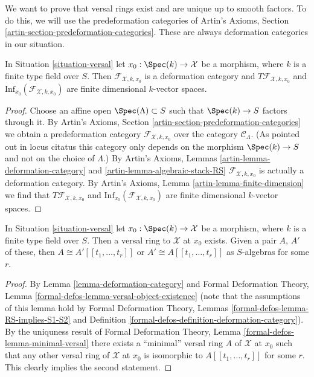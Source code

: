 \noindent
We want to prove that versal rings exist and are unique up to
smooth factors. To do this, we will use the predeformation categories of
Artin's Axioms, Section \ref{artin-section-predeformation-categories}.
These are always deformation categories in our situation.

\begin{lemma}
\label{lemma-deformation-category}
In Situation \ref{situation-versal} let $x_0 : \Spec(k) \to \mathcal{X}$
be a morphism, where $k$ is a finite type field over $S$.
Then $\mathcal{F}_{\mathcal{X}, k, x_0}$
is a deformation category and $T\mathcal{F}_{\mathcal{X}, k, x_0}$
and $\text{Inf}_{x_0}(\mathcal{F}_{\mathcal{X}, k, x_0})$
are finite dimensional $k$-vector spaces.
\end{lemma}

\begin{proof}
Choose an affine open $\Spec(\Lambda) \subset S$ such that
$\Spec(k) \to S$ factors through it.
By Artin's Axioms, Section \ref{artin-section-predeformation-categories}
we obtain a predeformation category
$\mathcal{F}_{\mathcal{X}, k, x_0}$
over the category $\mathcal{C}_\Lambda$.
(As pointed out in locus citatus this category only depends
on the morphism $\Spec(k) \to S$ and not on the choice of
$\Lambda$.) By Artin's Axioms, Lemmas
\ref{artin-lemma-deformation-category} and
\ref{artin-lemma-algebraic-stack-RS}
$\mathcal{F}_{\mathcal{X}, k, x_0}$ is actually a deformation category.
By Artin's Axioms, Lemma \ref{artin-lemma-finite-dimension}
we find that $T\mathcal{F}_{\mathcal{X}, k, x_0}$
and $\text{Inf}_{x_0}(\mathcal{F}_{\mathcal{X}, k, x_0})$
are finite dimensional $k$-vector spaces.
\end{proof}

\begin{lemma}
\label{lemma-versal-ring}
In Situation \ref{situation-versal} let $x_0 : \Spec(k) \to \mathcal{X}$
be a morphism, where $k$ is a finite type field over $S$.
Then a versal ring to $\mathcal{X}$ at $x_0$ exists. Given a pair
$A$, $A'$ of these, then $A \cong A'[[t_1, \ldots, t_r]]$
or $A' \cong A[[t_1, \ldots, t_r]]$ as $S$-algebras
for some $r$.
\end{lemma}

\begin{proof}
By Lemma \ref{lemma-deformation-category} and
Formal Deformation Theory, Lemma
\ref{formal-defos-lemma-versal-object-existence}
(note that the assumptions of this lemma hold by
Formal Deformation Theory, Lemmas
\ref{formal-defos-lemma-RS-implies-S1-S2} and
Definition \ref{formal-defos-definition-deformation-category}).
By the uniquness result of
Formal Deformation Theory, Lemma \ref{formal-defos-lemma-minimal-versal}
there exists a ``minimal'' versal ring $A$ of $\mathcal{X}$ at $x_0$
such that any other versal ring of $\mathcal{X}$ at $x_0$ is
isomorphic to $A[[t_1, \ldots, t_r]]$ for some $r$.
This clearly implies the second statement.
\end{proof}

